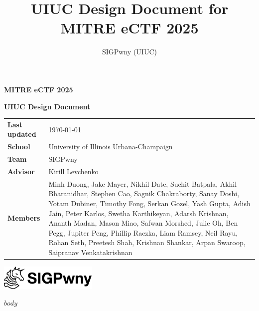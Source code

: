\documentclass[12pt]{article}
\title{UIUC Design Document for MITRE eCTF 2025}
\author{SIGPwny (UIUC)}
\begin{document}
\pagestyle{plain}
\thispagestyle{empty}

\vspace*{0.3\textheight}

\begin{flushleft}
{\fontsize{48}{52}\selectfont\textbf{MITRE eCTF 2025}}
\par\bigskip
{\fontsize{28}{32}\selectfont\textbf{UIUC Design Document}}
\par\bigskip
\begin{tabularx}{\linewidth}{@{}>{\bfseries}l@{\hspace{.5em}}X@{}}
  Last updated & \today \\
  School & University of Illinois Urbana-Champaign \\
  Team & SIGPwny \\
  Advisor & Kirill Levchenko \\
  Members & \raggedright
    Minh Duong,
    Jake Mayer,
    Nikhil Date,
    Suchit Batpala,
    Akhil Bharanidhar,
    Stephen Cao,
    Sagnik Chakraborty,
    Sanay Doshi,
    Yotam Dubiner,
    Timothy Fong,
    Serkan Gozel,
    Yash Gupta,
    Adish Jain,
    Peter Karlos,
    Swetha Karthikeyan,
    Adarsh Krishnan,
    Ananth Madan,
    Mason Miao,
    Safwan Morshed,
    Julie Oh,
    Ben Pegg,
    Jupiter Peng,
    Phillip Raczka,
    Liam Ramsey,
    Neil Rayu,
    Rohan Seth,
    Preetesh Shah,
    Krishnan Shankar,
    Arpan Swaroop,
    Saipranav Venkatakrishnan
\end{tabularx}

\vspace{\fill}

\includegraphics[width=0.35\textwidth]{assets/pwny8-banner-transparent.pdf}\\
\end{flushleft}

\newpage

\tableofcontents

\newpage

$body$
\end{document}

